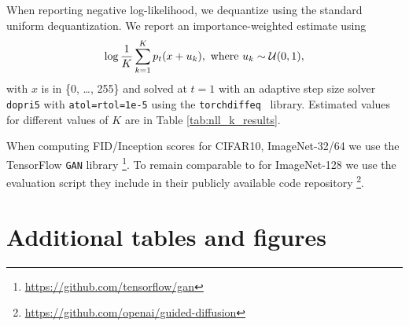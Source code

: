 \documentclass{article}
\renewcommand{\ra}[1]{\renewcommand{\arraystretch}{#1}}
\begin{document}
When reporting negative log-likelihood, we dequantize using the standard uniform dequantization. We report an importance-weighted estimate using
\begin{equation}
    \log \frac{1}{K} \sum_{k=1}^K p_t (x + u_k), \text{ where } u_k \sim {\mathcal{U}}(0, 1),
\end{equation}
with $x$ is in \{0, \dots, 255\} and solved at $t=1$ with an adaptive step size solver \texttt{dopri5} with \texttt{atol=rtol=1e-5} using the \texttt{torchdiffeq}~\citep{torchdiffeq} library. Estimated values for different values of $K$ are in Table \ref{tab:nll_k_results}.

When computing FID/Inception scores for CIFAR10, ImageNet-32/64 we use the TensorFlow \lstinline{GAN} library \footnote{\url{https://github.com/tensorflow/gan}}.  To remain comparable to \cite{dhariwal2021diffusion} for ImageNet-128 we use the evaluation script they include in their publicly available code repository \footnote{\url{https://github.com/openai/guided-diffusion}}.



\section{Additional tables and figures}

\begin{table}\centering
\ra{1.2}
\setlength{\tabcolsep}{2.5pt}
\caption{Negative log-likelihood (in bits per dimension) on the test set with different values of $K$ using uniform dequantization. }
\label{tab:nll_k_results}
\end{table}
\end{document}
